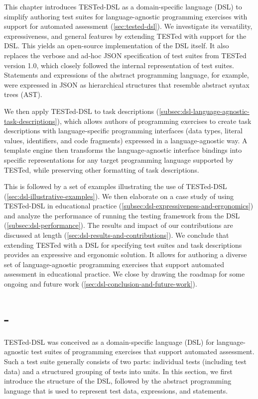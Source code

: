 \documentclass[../main]{subfiles}
\begin{document}
This chapter introduces TESTed-DSL as a domain-specific language (DSL) to simplify authoring test suites for language-agnostic programming exercises with support for automated assessment (\vref{sec:tested-dsl}).
We investigate its versatility, expressiveness, and general features by extending TESTed with support for the DSL\@.
This yields an open-source implementation of the DSL itself.
It also replaces the verbose and ad-hoc JSON specification of test suites from TESTed version 1.0, which closely followed the internal representation of test suites.
Statements and expressions of the abstract programming language, for example, were expressed in JSON as hierarchical structures that resemble abstract syntax trees (AST).

We then apply TESTed-DSL to task descriptions (\vref{subsec:dsl-language-agnostic-task-descriptions}), which allows authors of programming exercises to create task descriptions with language-specific programming interfaces (data types, literal values, identifiers, and code fragments) expressed in a language-agnostic way.
A template engine then transforms the language-agnostic interface bindings into specific representations for any target programming language supported by TESTed, while preserving other formatting of task descriptions.

This is followed by a set of examples illustrating the use of TESTed-DSL (\vref{sec:dsl-illustrative-examples}).
We then elaborate on a case study of using TESTed-DSL in educational practice (\vref{subsec:dsl-expressiveness-and-ergonomics}) and analyze the performance of running the testing framework from the DSL (\vref{subsec:dsl-performance}).
The results and impact of our contributions are discussed at length (\vref{sec:dsl-results-and-contributions}).
We conclude that extending TESTed with a DSL for specifying test suites and task descriptions provides an expressive and ergonomic solution.
It allows for authoring a diverse set of language-agnostic programming exercises that support automated assessment in educational practice.
We close by drawing the roadmap for some ongoing and future work (\vref{sec:dsl-conclusion-and-future-work}).

\section{\tested{}-\dsl{}}\label{sec:tested-dsl}

TESTed-DSL was conceived as a domain-specific language (DSL) for language-agnostic test suites of programming exercises that support automated assessment.
Such a test suite generally consists of two parts: individual tests (including test data) and a structured grouping of tests into units.
In this section, we first introduce the structure of the DSL, followed by the abstract programming language that is used to represent test data, expressions, and statements.
\end{document}
